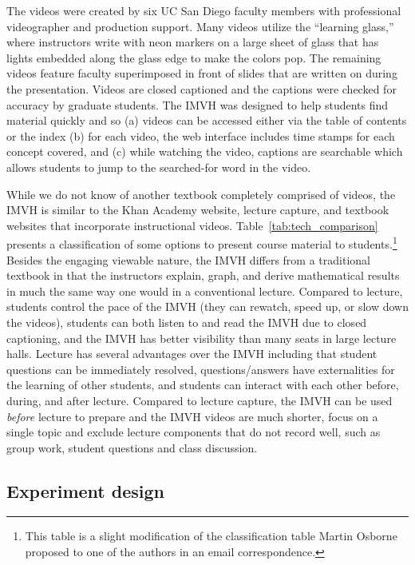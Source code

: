 The videos were created by six UC San Diego faculty members with professional videographer and production support.
Many videos utilize the ``learning glass,'' where instructors write with neon markers on a large sheet of glass that has lights embedded along the glass edge to make the colors pop.
The remaining videos feature faculty superimposed in front of slides that are written on during the presentation.
Videos are closed captioned and the captions were checked for accuracy by graduate students.
The IMVH was designed to help students find material quickly and so (a) videos can be accessed either via the table of contents or the index (b) for each video, the web interface includes time stamps for each concept covered, and (c) while watching the video, captions are searchable which allows students to jump to the searched-for word in the video.

While we do not know of another textbook completely comprised of videos, the IMVH is similar to the Khan Academy website, lecture capture, and textbook websites that incorporate instructional videos.
Table~\ref{tab:tech_comparison} presents a classification of some options to present course material to students.\footnote{This table is a slight modification of the classification table Martin Osborne proposed to one of the authors in an email correspondence.}
Besides the engaging viewable nature, the IMVH differs from a traditional textbook in that the instructors explain, graph, and derive mathematical results in much the same way one would in a conventional lecture.
Compared to lecture, students control the pace of the IMVH (they can rewatch, speed up, or slow down the videos), students can both listen to and read the IMVH due to closed captioning, and the IMVH has better visibility than many seats in large lecture halls.
Lecture has several advantages over the IMVH including that student questions can be immediately resolved, questions/answers have externalities for the learning of other students, and students can interact with each other before, during, and after lecture.
Compared to lecture capture, the IMVH can be used \textit{before} lecture to prepare and the IMVH videos are much shorter, focus on a single topic and exclude lecture components that do not record well, such as group work, student questions and class discussion.


\subsection{Experiment design} \label{subsec:expdesign}

